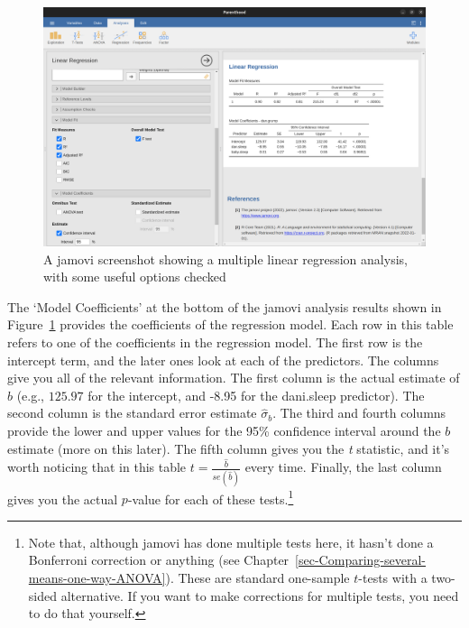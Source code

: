 \documentclass[
  a4paper,
]{book}
\begin{document}
\begin{figure}

\includegraphics[width=1\textwidth,height=\textheight]{images/fig12-15.png} \hfill{}

\caption{\label{fig-fig12-15}A jamovi screenshot showing a multiple
linear regression analysis, with some useful options checked}

\end{figure}

The `Model Coefficients' at the bottom of the jamovi analysis results
shown in Figure~\ref{fig-fig12-15} provides the coefficients of the
regression model. Each row in this table refers to one of the
coefficients in the regression model. The first row is the intercept
term, and the later ones look at each of the predictors. The columns
give you all of the relevant information. The first column is the actual
estimate of \(b\) (e.g., \(125.97\) for the intercept, and -8.95 for the
dani.sleep predictor). The second column is the standard error estimate
\(\hat{\sigma}_b\). The third and fourth columns provide the lower and
upper values for the 95\% confidence interval around the \(b\) estimate
(more on this later). The fifth column gives you the \emph{t} statistic,
and it's worth noticing that in this table
\(t=\frac{\hat{b}} {se({\hat{b}})}\) every time. Finally, the last
column gives you the actual \(p\)-value for each of these
tests.\footnote{Note that, although jamovi has done multiple tests here,
  it hasn't done a Bonferroni correction or anything (see
  Chapter~\ref{sec-Comparing-several-means-one-way-ANOVA}). These are
  standard one-sample \(t\)-tests with a two-sided alternative. If you
  want to make corrections for multiple tests, you need to do that
  yourself.}
\end{document}

